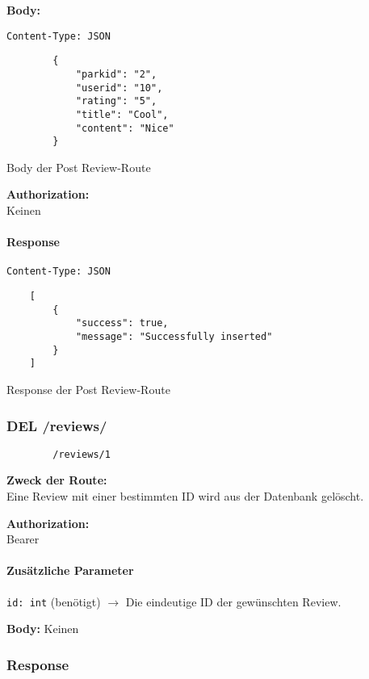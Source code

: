 \textbf{Body:} \\
\begin{code}
    \lstinline{Content-Type: JSON}
    \begin{lstlisting}
        {
            "parkid": "2",
            "userid": "10",
            "rating": "5",
            "title": "Cool",
            "content": "Nice"
        }
    \end{lstlisting}
    \caption{Body der Post Review-Route}
\end{code}

\textbf{Authorization:} \\
Keinen

\paragraph{Response }
\begin{code}
    \lstinline{Content-Type: JSON}
    \begin{lstlisting}
    [
        {
            "success": true,
            "message": "Successfully inserted"
        }
    ]
    \end{lstlisting}
    \caption{Response der Post Review-Route}
\end{code}

\pagebreak


\subsubsection{DEL /reviews/}


\begin{lstlisting}
        /reviews/1
    \end{lstlisting}

\textbf{Zweck der Route:} \\
Eine Review mit einer bestimmten ID wird aus der Datenbank gelöscht.

\textbf{Authorization:} \\
Bearer

\paragraph{Zusätzliche Parameter}
\lstinline{id: int} (benötigt)
$\rightarrow$ Die eindeutige ID der gewünschten Review.

\textbf{Body:}
Keinen


\subsubsection{Response}


